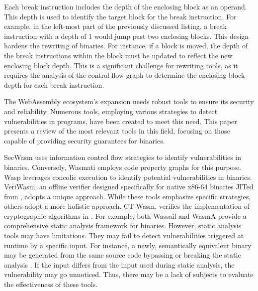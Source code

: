 

Each break instruction includes the depth of the enclosing block as an operand. 
This depth is used to identify the target block for the break instruction. 
For example, in the left-most part of the previously discussed listing, a break instruction with a depth of 1 would jump past two enclosing blocks.
This design hardens the rewriting of \wasm binaries.
For instance, if a block is moved, the depth of the break instructions within the block must be updated to reflect the new enclosing block depth.
This is a significant challenge for rewriting tools, as it requires the analysis of the control flow graph to determine the enclosing block depth for each break instruction.

\label{background:wasm:analysis}

The WebAssembly ecosystem's expansion needs robust tools to ensure its security and reliability. 
Numerous tools, employing various strategies to detect vulnerabilities in \Wasm programs, have been created to meet this need. 
This paper presents a review of the most relevant tools in this field, focusing on those capable of providing security guarantees for \Wasm binaries.

 SecWasm\cite{secwasm} uses information control flow strategies to identify vulnerabilities in \Wasm binaries. 
Conversely, Wasmati\cite{wasmati} employs code property graphs for this purpose. 
Wasp\cite{Wasp} leverages concolic execution to identify potential vulnerabilities in \Wasm binaries. 
VeriWasm\cite{veriwasm}, an offline verifier designed specifically for native x86-64 binaries JITed from \Wasm, adopts a unique approach. 
While these tools emphasize specific strategies, others adopt a more holistic approach. 
CT-Wasm\cite{ctwasm}, verifies the implementation of cryptographic algorithms in \Wasm. 
For example, both Wassail\cite{wassail} and WasmA\cite{WasmA} provide a comprehensive static analysis framework for \Wasm binaries. 
However, static analysis tools may have limitations. 
They may fail to detect vulnerabilities triggered at runtime by a specific \Wasm input. 
For instance, a newly, semantically equivalent \Wasm binary may be generated from the same source code bypassing or breaking the static analysis \cite{breaking example}.
If the \Wasm input differs from the input used during static analysis, the vulnerability may go unnoticed. 
Thus, there may be a lack of subjects to evaluate the effectiveness of these tools.

